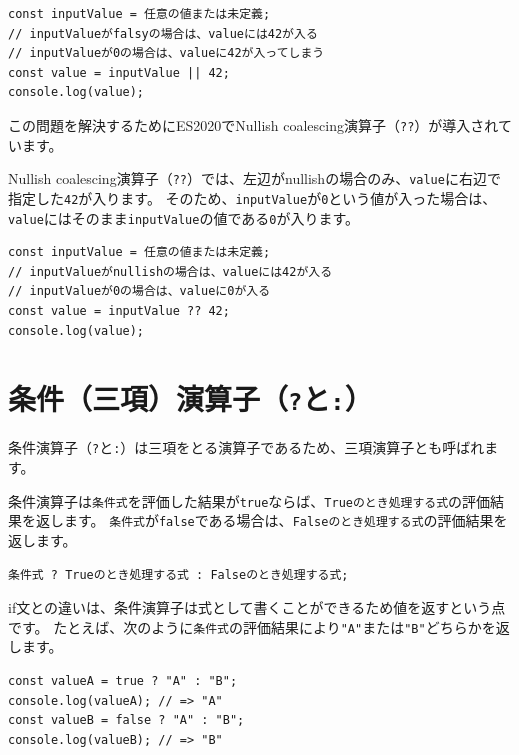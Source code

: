 \begin{lstlisting}
const inputValue = 任意の値または未定義;
// inputValueがfalsyの場合は、valueには42が入る
// inputValueが0の場合は、valueに42が入ってしまう
const value = inputValue || 42;
console.log(value);
\end{lstlisting}

この問題を解決するためにES2020でNullish coalescing演算子（\texttt{??}）が導入されています。

Nullish coalescing演算子（\texttt{??}）では、左辺がnullishの場合のみ、\texttt{value}に右辺で指定した\texttt{42}が入ります。
そのため、\texttt{inputValue}が\texttt{0}という値が入った場合は、\texttt{value}にはそのまま\texttt{inputValue}の値である\texttt{0}が入ります。

\begin{lstlisting}
const inputValue = 任意の値または未定義;
// inputValueがnullishの場合は、valueには42が入る
// inputValueが0の場合は、valueに0が入る
const value = inputValue ?? 42;
console.log(value);
\end{lstlisting}

\hypertarget{ternary-operator}{%
\section{\texorpdfstring{条件（三項）演算子（\texttt{?}と\texttt{:}）}{条件（三項）演算子（?と:）}}\label{ternary-operator}}

条件演算子（\texttt{?}と\texttt{:}）は三項をとる演算子であるため、三項演算子とも呼ばれます。

条件演算子は\texttt{条件式}を評価した結果が\texttt{true}ならば、\texttt{Trueのとき処理する式}の評価結果を返します。
\texttt{条件式}が\texttt{false}である場合は、\texttt{Falseのとき処理する式}の評価結果を返します。

\begin{lstlisting}
条件式 ? Trueのとき処理する式 : Falseのとき処理する式;
\end{lstlisting}

if文との違いは、条件演算子は式として書くことができるため値を返すという点です。
たとえば、次のように\texttt{条件式}の評価結果により\texttt{"A"}または\texttt{"B"}どちらかを返します。

\enlargethispage{\baselineskip}\begin{lstlisting}
const valueA = true ? "A" : "B";
console.log(valueA); // => "A"
const valueB = false ? "A" : "B";
console.log(valueB); // => "B"
\end{lstlisting}

